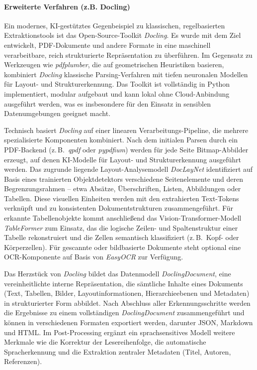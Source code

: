 \paragraph{Erweiterte Verfahren (z.B. Docling)}
Ein modernes, KI-gestütztes Gegenbeispiel zu klassischen, regelbasierten Extraktionstools ist das Open-Source-Toolkit \emph{Docling}. 
Es wurde mit dem Ziel entwickelt, PDF-Dokumente und andere Formate in eine maschinell verarbeitbare, reich strukturierte Repräsentation zu überführen. 
Im Gegensatz zu Werkzeugen wie \emph{pdfplumber}, die auf geometrischen Heuristiken basieren, kombiniert \emph{Docling} klassische Parsing-Verfahren mit 
tiefen neuronalen Modellen für Layout- und Strukturerkennung. \cite{Auer2024}
Das Toolkit ist vollständig in Python implementiert, modular aufgebaut und kann lokal ohne Cloud-Anbindung ausgeführt werden, 
was es insbesondere für den Einsatz in sensiblen Datenumgebungen geeignet macht. \cite{Auer2025}

Technisch basiert \emph{Docling} auf einer linearen Verarbeitungs-Pipeline, die mehrere spezialisierte Komponenten kombiniert. 
Nach dem initialen Parsen durch ein PDF-Backend (z.\,B.\ \emph{qpdf} oder \emph{pypdfium}) werden für jede Seite Bitmap-Abbilder erzeugt, 
auf denen KI-Modelle für Layout- und Strukturerkennung ausgeführt werden. \cite{Auer2024}
Das zugrunde liegende Layout-Analysemodell \emph{DocLayNet} identifiziert auf Basis eines trainierten Objektdetektors verschiedene 
Seitenelemente und deren Begrenzungsrahmen – etwa Absätze, Überschriften, Listen, Abbildungen oder Tabellen.  \cite{Auer2024}
Diese visuellen Einheiten werden mit den extrahierten Text-Tokens verknüpft und zu konsistenten Dokumentstrukturen zusammengeführt. 
Für erkannte Tabellenobjekte kommt anschließend das Vision-Transformer-Modell \emph{TableFormer} zum Einsatz, das die logische Zeilen- und Spaltenstruktur 
einer Tabelle rekonstruiert und die Zellen semantisch klassifiziert (z.\,B.\ Kopf- oder Körperzellen).  
Für gescannte oder bildbasierte Dokumente steht optional eine OCR-Komponente auf Basis von \emph{EasyOCR} zur Verfügung. \cite{Auer2025}

Das Herzstück von \emph{Docling} bildet das Datenmodell \emph{DoclingDocument}, eine vereinheitlichte interne Repräsentation, die sämtliche 
Inhalte eines Dokuments (Text, Tabellen, Bilder, Layoutinformationen, Hierarchieebenen und Metadaten) in strukturierter Form abbildet. 
Nach Abschluss aller Erkennungsschritte werden die Ergebnisse zu einem vollständigen \emph{DoclingDocument} zusammengeführt und können in 
verschiedenen Formaten exportiert werden, darunter JSON, Markdown und HTML. 
Im Post-Processing ergänzt ein sprachsensitives Modell weitere Merkmale wie die Korrektur der Lesereihenfolge, die automatische Spracherkennung und die 
Extraktion zentraler Metadaten (Titel, Autoren, Referenzen).
\cite{Auer2024}

